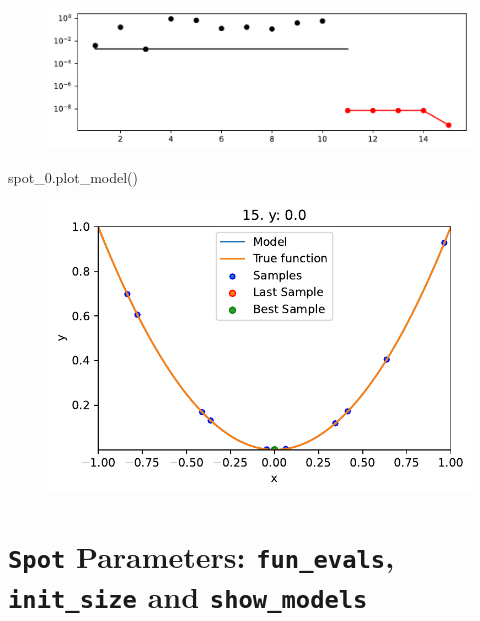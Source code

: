 \documentclass[
  letterpaper,
  DIV=11,
  numbers=noendperiod]{scrreprt}
\newenvironment{Shaded}{\begin{snugshade}}{\end{snugshade}}
\newcommand{\NormalTok}[1]{\textcolor[rgb]{0.00,0.23,0.31}{#1}}
\begin{document}
\begin{figure}[H]

{\centering \includegraphics{01_spot_intro_files/figure-pdf/cell-8-output-1.pdf}

}

\end{figure}

\begin{Shaded}
\begin{Highlighting}[]
\NormalTok{spot\_0.plot\_model()}
\end{Highlighting}
\end{Shaded}

\begin{figure}[H]

{\centering \includegraphics{01_spot_intro_files/figure-pdf/cell-9-output-1.pdf}

}

\end{figure}

\hypertarget{spot-parameters-fun_evals-init_size-and-show_models}{%
\section{\texorpdfstring{\texttt{Spot} Parameters: \texttt{fun\_evals},
\texttt{init\_size} and
\texttt{show\_models}}{Spot Parameters: fun\_evals, init\_size and show\_models}}\label{spot-parameters-fun_evals-init_size-and-show_models}}
\end{document}

